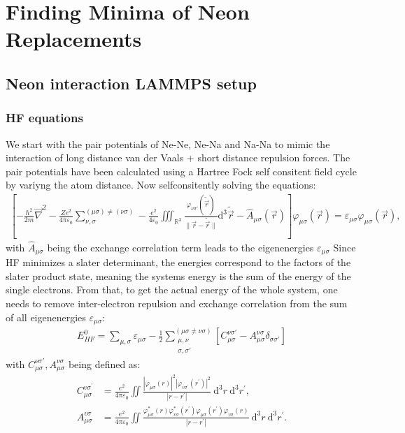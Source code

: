 
\chapter{Finding Minima of Neon Replacements}
\label{chap:Erstes Kapitel}
\section{Neon interaction LAMMPS setup}
\subsection{\ac{HF} equations}
We start with the pair potentials of Ne-Ne, Ne-Na and Na-Na to mimic the interaction of long distance van der Vaals + short distance repulsion forces. The pair potentials have been calculated using a Hartree Fock self consitent field cycle by variyng the atom distance. Now selfconsitently solving the equations:\\
\begin{align}
	\left[-\frac{\hbar^2}{2m}\vec{\nabla}^2-\frac{Ze^2}{4\pi\varepsilon_0}\sum_{\nu,\sigma}^{(\mu\sigma)\neq(\nu\sigma)}-\frac{e^2}{4\varepsilon_0}\iiint_{\mathbb{R}^3}\frac{\varphi_{\nu\sigma'}(\tilde{\vec{r}})}{\|\vec{r}-\tilde{\vec{r}}\|}\mathrm{d}^3\tilde{\vec{r}}-\hat{A}_{\mu\sigma}(\vec{r})\right]\varphi_{\mu\sigma}(\vec{r})=\varepsilon_{\mu\sigma}\varphi_{\mu\sigma}(\vec{r}),
\end{align}
with $\hat{A}_{\mu\sigma}$ being the exchange correlation term leads to the eigenenergies $\varepsilon_{\mu\sigma}$ Since \ac{HF} 
minimizes a slater determinant, the energies correspond to the factors of the slater product state, meaning the systems energy is the sum of the energy of the single electrons. From that, to get the actual energy of the whole system, one needs to remove inter-electron repulsion and exchange correlation from the sum of all eigenenergies $\varepsilon_{\mu\sigma}$:
\begin{align}
	E_{HF}^0 = \sum_{\mu,\sigma}\varepsilon_{\mu\sigma}-\frac{1}{2}\sum_{\substack{\mu,\nu\\\sigma,\sigma'}}^{(\mu\sigma\neq\nu\sigma)}\left[C_{\mu\sigma}^{\nu\sigma'}-A_{\mu\sigma}^{\nu\sigma}\delta_{\sigma\sigma'}\right]
\end{align}
with $C_{\mu\sigma}^{\nu\sigma'},A_{\mu\sigma}^{\nu\sigma}$ being defined as:
\begin{align}
	C_{\mu \sigma}^{v \sigma^{\prime}}&=\frac{e^2}{4 \pi \varepsilon_0} \iint  \frac{\left|\varphi_{\mu \sigma}(r)\right|^2\left|\varphi_{v \sigma^{\prime}}\left(r^{\prime}\right)\right|^2}{\left|r-r^{\prime}\right|}\mathrm{~d}^3 r \mathrm{~d}^3 r^{\prime},
	\\
	A_{\mu \sigma}^{v \sigma}&=\frac{e^2}{4 \pi \varepsilon_0} \iint \frac{\varphi_{\mu \sigma}^*(r) \varphi_{v \sigma}^*\left(r^{\prime}\right) \varphi_{\mu \sigma}\left(r^{\prime}\right) \varphi_{v \sigma}(r)}{\left|r-r^{\prime}\right|} \mathrm{~d}^3 r \mathrm{~d}^3 r^{\prime}.
\end{align}
